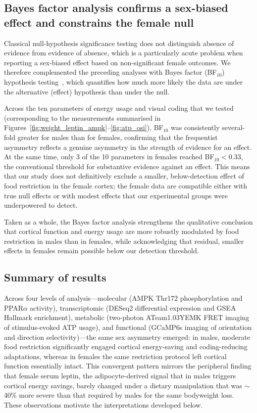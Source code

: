 \documentclass[11pt]{article}
\begin{document}
\subsection{Bayes factor analysis confirms a sex-biased effect and constrains the female null}

Classical null-hypothesis significance testing does not distinguish absence of evidence from evidence of absence, which is a particularly acute problem when reporting a sex-biased effect based on non-significant female outcomes. We therefore complemented the preceding analyses with Bayes factor (BF$_{10}$) hypothesis testing~\citep{sekulovski2024bayes}, which quantifies how much more likely the data are under the alternative (effect) hypothesis than under the null.

Across the ten parameters of energy usage and visual coding that we tested (corresponding to the measurements summarised in Figures~\ref{fig:weight_leptin_ampk}--\ref{fig:atp_osi}), BF$_{10}$ was consistently several-fold greater for males than for females, confirming that the frequentist asymmetry reflects a genuine asymmetry in the strength of evidence for an effect. At the same time, only 3 of the 10 parameters in females reached BF$_{10} < 0.33$, the conventional threshold for substantive evidence against an effect. This means that our study does not definitively exclude a smaller, below-detection effect of food restriction in the female cortex; the female data are compatible either with true null effects or with modest effects that our experimental groups were underpowered to detect.

Taken as a whole, the Bayes factor analysis strengthens the qualitative conclusion that cortical function and energy usage are more robustly modulated by food restriction in males than in females, while acknowledging that residual, smaller effects in females remain possible below our detection threshold.

\subsection{Summary of results}

Across four levels of analysis---molecular (AMPK Thr172 phosphorylation and PPAR$\alpha$ activity), transcriptomic (DESeq2 differential expression and GSEA Hallmark enrichment), metabolic (two-photon ATeam1.03YEMK FRET imaging of stimulus-evoked ATP usage), and functional (GCaMP6s imaging of orientation and direction selectivity)---the same sex asymmetry emerged: in males, moderate food restriction significantly engaged cortical energy-saving and coding-reducing adaptations, whereas in females the same restriction protocol left cortical function essentially intact. This convergent pattern mirrors the peripheral finding that female serum leptin, the adipocyte-derived signal that in males triggers cortical energy savings, barely changed under a dietary manipulation that was $\sim$40\% more severe than that required by males for the same bodyweight loss. These observations motivate the interpretations developed below.
\end{document}
